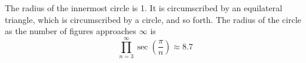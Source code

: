 \documentclass{article}
\begin{document}
\begin{preview}
\begin{center}
	
\end{center}

The radius of the innermost circle is 1.  It is circumscribed by an 
equilateral triangle, which is circumscribed by a circle, and so forth.  
The radius of the circle as the number of figures approaches $\infty$ is 
\[
  \prod_{n=3}^\infty \sec\left(\frac{\pi}{n}\right) \approx 8.7
\]

\end{preview}
\end{document}
